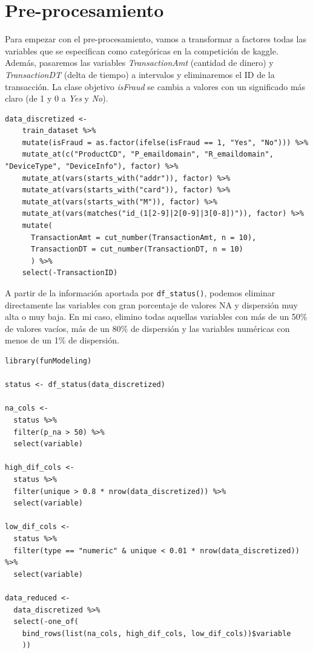 \section{Pre-procesamiento}
Para empezar con el pre-procesamiento, vamos a transformar a factores todas las
variables que se especifican como categóricas en la competición de kaggle.
Además, pasaremos las variables \textit{TransactionAmt} (cantidad de dinero) y
\textit{TransactionDT} (delta de tiempo) a intervalos y eliminaremos el ID de la
transacción. La clase objetivo \textit{isFraud} se cambia a valores con un
significado más claro (de 1 y 0 a \textit{Yes} y \textit{No}).

\begin{lstlisting}
data_discretized <- 
    train_dataset %>%
    mutate(isFraud = as.factor(ifelse(isFraud == 1, "Yes", "No"))) %>%
    mutate_at(c("ProductCD", "P_emaildomain", "R_emaildomain", "DeviceType", "DeviceInfo"), factor) %>%
    mutate_at(vars(starts_with("addr")), factor) %>%
    mutate_at(vars(starts_with("card")), factor) %>%
    mutate_at(vars(starts_with("M")), factor) %>%
    mutate_at(vars(matches("id_(1[2-9]|2[0-9]|3[0-8])")), factor) %>%
    mutate(
      TransactionAmt = cut_number(TransactionAmt, n = 10),
      TransactionDT = cut_number(TransactionDT, n = 10)
      ) %>%
    select(-TransactionID)
\end{lstlisting}

A partir de la información aportada por \lstinline{df_status()}, podemos
eliminar directamente las variables con gran porcentaje de valores NA y
dispersión muy alta o muy baja. En mi caso, elimino todas aquellas variables
con más de un 50\% de valores vacíos, más de un 80\% de dispersión y las
variables numéricas con menos de un 1\% de dispersión.

\begin{lstlisting}
library(funModeling)

status <- df_status(data_discretized)

na_cols <- 
  status %>%
  filter(p_na > 50) %>%
  select(variable)

high_dif_cols <- 
  status %>%
  filter(unique > 0.8 * nrow(data_discretized)) %>%
  select(variable)

low_dif_cols <-
  status %>%
  filter(type == "numeric" & unique < 0.01 * nrow(data_discretized)) %>%
  select(variable)

data_reduced <-
  data_discretized %>%
  select(-one_of(
    bind_rows(list(na_cols, high_dif_cols, low_dif_cols))$variable
    ))
\end{lstlisting}

